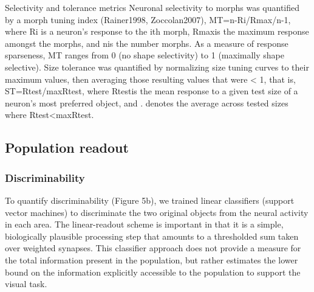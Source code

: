 Selectivity and tolerance metrics
Neuronal selectivity to morphs was quantified by a morph tuning index (Rainer1998, Zoccolan2007), MT=n-Ri/Rmax/n-1, where Ri is a neuron’s response to the ith morph, Rmaxis the maximum response amongst the morphs, and nis the number morphs. As a measure of response sparseness, MT ranges from 0 (no shape selectivity) to 1 (maximally shape selective). Size tolerance was quantified by normalizing size tuning curves to their maximum values, then averaging those resulting values that were < 1, that is, ST=Rtest/maxRtest, where Rtestis the mean response to a given test size of a neuron’s most preferred object, and . denotes the average across tested sizes where Rtest<maxRtest. 


\subsection{Population readout}
\subsubsection{Discriminability}
To quantify discriminability (Figure 5b), we trained linear classifiers (support vector machines) to discriminate the two original objects from the neural activity in each area. The linear-readout scheme is important in that it is a simple, biologically plausible processing step that amounts to a thresholded sum taken over weighted synapses\cite{}. This classifier approach does not provide a measure for the total information present in the population, but rather estimates the lower bound on the information explicitly accessible to the population to support the visual task\cite{everyone, Hung2005, Rust2010, etc etc}.

